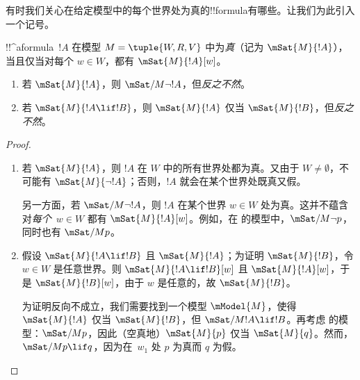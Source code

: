 \documentclass[../../../include/open-logic-section]{subfiles}
\begin{document}


有时我们关心在给定模型中的每个世界处为真的!!{formula}有哪些。让我们为此引入一个记号。

\begin{defn}
  !!^a{formula}~$!A$ 在模型 $M = \tuple{W, R,
    V}$ 中为\emph{真}（记为 $\mSat{M}{!A}$），当且仅当对每个 $w \in W$，都有 $\mSat{M}{!A}[w]$。
\end{defn}

\begin{prop}
  \begin{enumerate}
  \item 若 $\mSat{M}{!A}$，则 $\mSat/{M}{\lnot !A}$，但\emph{反之不然}。
  \item 若 $\mSat{M}{!A \lif !B}$，则 $\mSat{M}{!A}$ 仅当 $\mSat{M}{!B}$，但\emph{反之不然}。
  \end{enumerate}
\end{prop}

\begin{proof}
  \begin{enumerate}
  \item 若 $\mSat{M}{!A}$，则 $!A$ 在 $W$ 中的所有世界处都为真。又由于 $W \neq \emptyset$，不可能有 $\mSat{M}{\lnot!A}$；否则，$!A$ 就会在某个世界处既真又假。

    另一方面，若 $\mSat/{M}{\lnot !A}$，则 $!A$ 在某个世界 $w \in W$ 处为真。这并不蕴含对\emph{每个}~$w \in W$ 都有 $\mSat{M}{!A}[w]$。例如，在  的模型中，$\mSat/{M}{\lnot p}$，同时也有 $\mSat/{M}{p}$。
  \item 假设 $\mSat{M}{!A \lif !B}$ 且 $\mSat{M}{!A}$；为证明 $\mSat{M}{!B}$，令 $w \in W$ 是任意世界。则 $\mSat{M}{!A \lif !B}[w]$ 且 $\mSat{M}{!A}[w]$，于是 $\mSat{M}{!B}[w]$，由于 $w$ 是任意的，故 $\mSat{M}{!B}$。

    为证明反向不成立，我们需要找到一个模型 $\mModel{M}$，使得 $\mSat{M}{!A}$ 仅当 $\mSat{M}{!B}$，但 $\mSat/{M}{!A \lif !B}$。再考虑  的模型：$\mSat/{M}{p}$，因此（空真地）$\mSat{M}{p}$ 仅当 $\mSat{M}{q}$。然而，$\mSat/{M}{p \lif
      q}$，因为在~$w_1$ 处 $p$ 为真而 $q$ 为假。
  \end{enumerate}
\end{proof}
\end{document}
